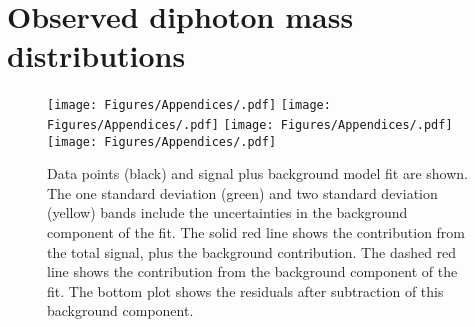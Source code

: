 \chapter{Observed diphoton mass distributions}
\label{app:massplots}

\begin{figure}[hptb]
  \centering
  \texttt{[image: Figures/Appendices/.pdf]}
  \texttt{[image: Figures/Appendices/.pdf]}
  \texttt{[image: Figures/Appendices/.pdf]}
  \texttt{[image: Figures/Appendices/.pdf]}
  \caption[Signal plus background fits to data.]
  {
    Data points (black) and signal plus background model fit are shown. 
    The one standard deviation (green) and two standard deviation (yellow) bands 
    include the uncertainties in the background component of the fit. 
    The solid red line shows the contribution from the total signal, plus the background contribution. 
    The dashed red line shows the contribution from the background component of the fit. 
    The bottom plot shows the residuals after subtraction of this background component.
  }
\end{figure}


%
